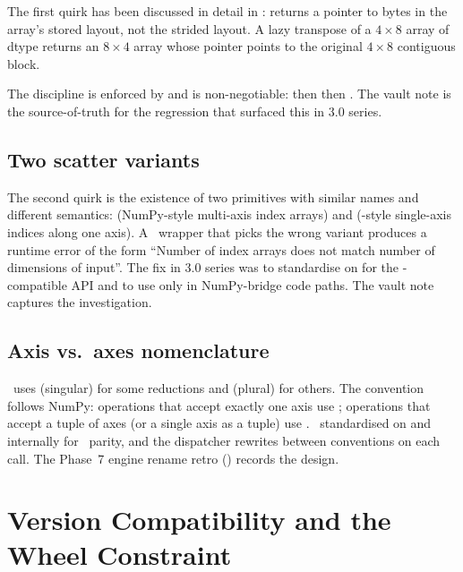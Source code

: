 The first quirk has been discussed in detail in
:  returns
a pointer to bytes in the array's stored layout, not the strided
layout. A lazy transpose of a \(4 \times 8\) array of dtype
 returns an \(8 \times 4\) array whose
 pointer points to the original \(4 \times 8\)
contiguous block.

The discipline is enforced by  and is
non-negotiable:  then  then
. The vault note
 is the source-of-truth for
the regression that surfaced this in 3.0 series.

\subsection{Two scatter variants}
\label{ssec:mlx_runtime:two_scatters}

The second quirk is the existence of two primitives with similar
names and different semantics:  (NumPy-style
multi-axis index arrays) and 
(-style single-axis indices along one axis). A
\Lucid\ wrapper that picks the wrong variant produces a runtime
error of the form ``Number of index arrays does not match number of
dimensions of input''. The fix in 3.0 series was to standardise on
 for the -compatible API and
to use  only in NumPy-bridge code paths. The
vault note  captures the
investigation.

\subsection{Axis vs.\ axes nomenclature}
\label{ssec:mlx_runtime:axis_axes}

\MLX\ uses  (singular) for some reductions and
 (plural) for others. The convention follows NumPy:
operations that accept exactly one axis use ; operations
that accept a tuple of axes (or a single axis as a tuple) use
. \Lucid\ standardised on  and 
internally for \ parity, and the dispatcher rewrites
between conventions on each call. The Phase~7 engine rename retro
() records the design.

\section{Version Compatibility and the Wheel Constraint}
\label{sec:mlx_runtime:versioning}


